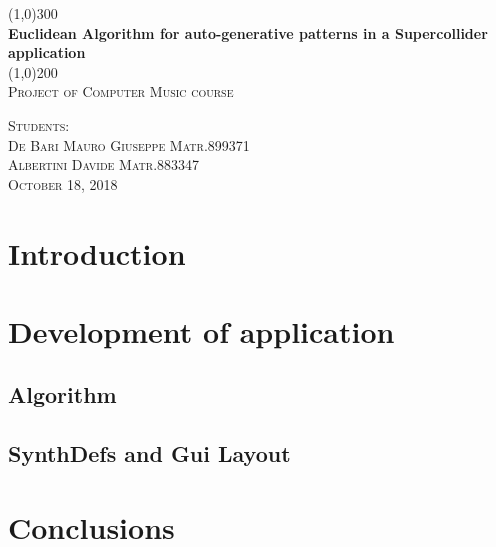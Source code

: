 \documentclass[a4paper]{article}
\begin{document}
\begin{titlepage}
	\begin{center}
	\line(1,0){300}\\
	[0.25in]
	\huge{\bfseries Euclidean Algorithm for auto-generative patterns in a Supercollider application}\\
	[2mm]
	\line(1,0){200}\\
	[1.5cm]
	\textsc{\LARGE Project of Computer Music course}\\
	[10.75cm]
	\end{center}
	\begin{flushright}
	\textsc{\large  Students:\\
	De Bari Mauro Giuseppe Matr.899371 \\
	Albertini Davide Matr.883347\\
	October 18, 2018 \\}
	\end{flushright}
\end{titlepage}

\tableofcontents
\newpage

\section{Introduction}


\section{Development of application}

\subsection{Algorithm}

\subsection{SynthDefs and Gui Layout}

\section{Conclusions}


\end{document}
